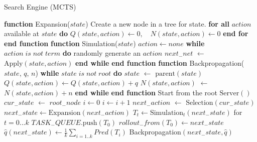 \documentclass[10pt,twocolumn,letterpaper]{article}
\begin{document}
\newpage

\begin{algorithm}[H]
  \caption{Search Engine (MCTS)}
  \label{MCTS}
    \begin{algorithmic}[1]
    \STATE \textbf{function} {Expansion}($state$)
    \STATE \quad Create a new node in a tree for state.
    \STATE \quad \textbf{for all} $action$ available at $state$ \textbf{do}
    \STATE \quad $Q(state, action) \leftarrow 0,\quad N(state, action) \leftarrow 0$ 
    \STATE \quad \textbf{end for}
    \STATE \textbf{end function}
    \STATE
    \STATE \textbf{function} {Simulation}($state$)
    \STATE $action \leftarrow none$
    \STATE \quad \textbf{while} $action\;is\;not\;term$ \textbf{do}
    \STATE \quad \quad randomly generate an $action$
    \STATE \quad \quad $next_{-}net$ $\leftarrow$ $\text{Apply}(state, action)$ 
    \STATE \quad \textbf{end while}
\STATE \textbf{end function}
    \STATE
    \STATE \textbf{function} {Backpropagation}($state$, $q$, $n$)
\STATE \quad \textbf{while} $state\;is\;not\;root$ \textbf{do}
    \STATE \quad \quad $state$ $\leftarrow$ $\text{parent}(state)$
    \STATE \quad \quad $Q(state, action) \leftarrow Q(state, action) + q$
    \STATE \quad \quad $N(state, action)$ $\leftarrow$ $N(state, action) + n$
    \STATE \quad \textbf{end while} 
    \STATE \textbf{end function}
    \STATE
       Start from the root
      \STATE $\text{Server}()$  \STATE $cur_{-}state$ $\leftarrow$ $root_{-}node$
      \STATE $i \leftarrow 0$
      \STATE $i \leftarrow i + 1$
      \STATE $next_{-}action$ $\leftarrow$ $\text{Selection}(cur_{-}state)$ 
      \STATE $next_{-}state \leftarrow \text{Expansion}(next_{-}action)$
      \STATE $T_t \leftarrow \text{Simulation}_t(next_{-}state)$ for $t=0...k$ 
      \STATE $TASK_{-}QUEUE.\text{push}(T_0)$
      \STATE $rollout_{-}from(T_0) \leftarrow next_{-}state$
      \STATE $\hat{q}(next_{-}state) \leftarrow \frac{1}{k} \sum_{i=1..k}Pred(T_i)$ 
      \STATE Backpropagation$(next_{-}state, \hat{q})$ 
      \ENDIF
      \ENDWHILE
      \ENDWHILE
    \end{algorithmic}
\end{algorithm}
\end{document}
